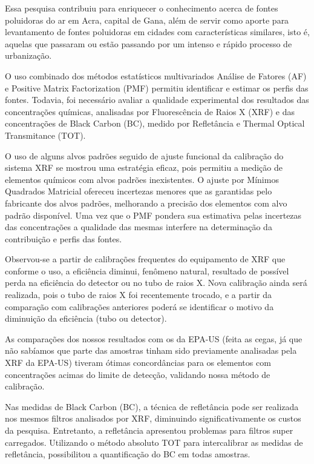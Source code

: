 
Essa pesquisa contribuiu para enriquecer o conhecimento acerca de fontes poluidoras do ar em Acra, capital de Gana, além de servir como aporte para levantamento de fontes poluidoras em cidades com características similares, isto é, aquelas que passaram ou estão passando por um intenso e rápido processo de urbanização.  

O uso combinado dos métodos estatísticos multivariados Análise de Fatores (AF) e Positive Matrix Factorization (PMF) permitiu identificar e estimar os perfis das fontes. Todavia, foi necessário avaliar a qualidade experimental dos resultados das concentrações químicas, analisadas por Fluorescência de Raios X (XRF) e das concentrações de Black Carbon (BC), medido por Refletância e Thermal Optical Transmitance (TOT). 

O uso de alguns alvos padrões seguido de ajuste funcional da calibração do sistema XRF se mostrou uma estratégia eficaz, pois permitiu a medição de elementos químicos com alvos padrões inexistentes. O ajuste por Mínimos Quadrados Matricial ofereceu incertezas menores que as garantidas pelo fabricante dos alvos padrões, melhorando a precisão dos elementos com alvo padrão disponível. Uma vez que o PMF pondera sua estimativa pelas incertezas das concentrações a qualidade das mesmas interfere na determinação da contribuição e perfis das fontes.

Observou-se a partir de calibrações frequentes do equipamento de XRF que conforme o uso, a eficiência diminui, fenômeno natural, resultado de possível perda na eficiência do detector ou no tubo de raios X. Nova calibração ainda será realizada, pois o tubo de raios X foi recentemente trocado, e a partir da comparação com calibrações anteriores poderá se identificar o motivo da diminuição da eficiência (tubo ou detector).

As comparações dos nossos resultados com os da EPA-US (feita as cegas, já que não sabíamos que parte das amostras tinham sido previamente analisadas pela XRF da EPA-US) tiveram ótimas concordâncias para os elementos com concentrações acimas do limite de detecção, validando nossa método de calibração.   

Nas medidas de Black Carbon (BC), a técnica de refletância pode ser realizada nos mesmos filtros analisados por XRF, diminuindo significativamente os custos da pesquisa. Entretanto, a refletância apresentou problemas para filtros super carregados. Utilizando o método absoluto TOT para intercalibrar as medidas de refletância, possibilitou a quantificação do BC em todas amostras. 

